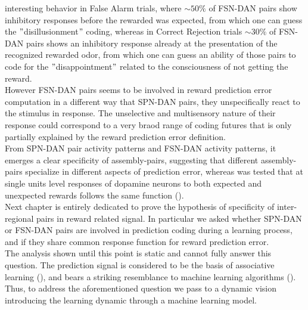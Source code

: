 interesting behavior in False Alarm trials, where $\sim 50\%$ of FSN-DAN pairs show inhibitory responses before the rewarded was expected, from which one can guess the $"$disillusionment$"$ coding, whereas in Correct Rejection trials $\sim 30\%$ of FSN-DAN pairs shows an inhibitory response already at the presentation of the recognized rewarded odor, from which one can guess an ability of those pairs to code for the $"$disappointment$"$ related to the consciousness of not getting the reward.\\However FSN-DAN pairs seems to be involved in reward prediction error computation in a different way that SPN-DAN pairs, they unspecifically react to the stimulus in response. The unselective and multisensory nature of their response could correspond to a very braod range of coding futures that is only partially explained by the reward prediction error definition.\\From SPN-DAN pair activity patterns and FSN-DAN activity patterns, it emerges a clear specificity of assembly-pairs, suggesting that different assembly-pairs specialize in different aspects of prediction error, whereas was tested that at single units level responses of dopamine neurons to both expected and unexpected rewards follows the same function (\cite{UchidaDop}).\\Next chapter is entirely dedicated to prove the hypothesis of specificity of inter-regional pairs in reward related signal. In particular we asked whether SPN-DAN or FSN-DAN pairs are involved in prediction coding during a learning process, and if they share common response function for reward prediction error.\\The analysis shown until this point is static and cannot fully answer this question. The prediction signal is considered to be the basis of associative learning (\cite{RescorlaWagner}), and bears a striking resemblance to machine learning algorithms (\cite{SuttonBarto}). Thus, to address the aforementioned question we pass to a dynamic vision introducing the learning dynamic through a machine learning model.

